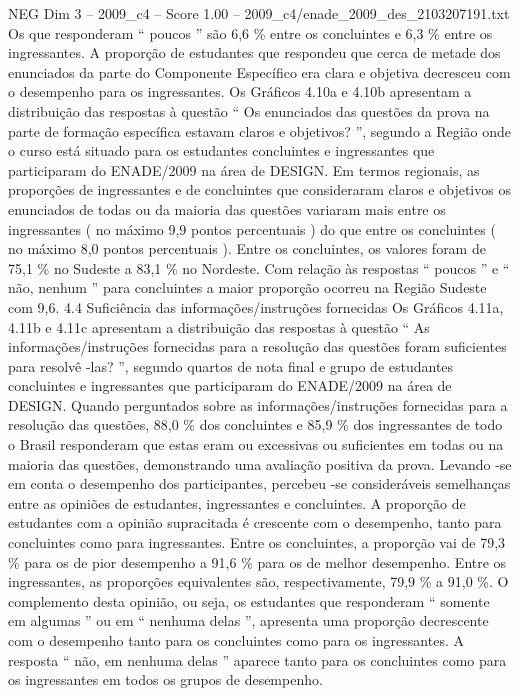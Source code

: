 \begin{textsample}{NEG Dim 3 – 2009\_c4 – Score 1.00 – 2009\_c4/enade\_2009\_des\_2103207191.txt}
Os que responderam “ poucos ” são 6,6 \% entre os concluintes e 6,3 \% entre os ingressantes.
A proporção de estudantes que respondeu que cerca de metade dos enunciados da parte do Componente Específico era clara e objetiva decresceu com o desempenho para os ingressantes.
Os Gráficos 4.10a e 4.10b apresentam a distribuição das respostas à questão “ Os enunciados das questões da prova na parte de formação específica estavam claros e objetivos? ”, segundo a Região onde o curso está situado para os estudantes concluintes e ingressantes que participaram do ENADE/2009 na área de DESIGN.
Em termos regionais, as proporções de ingressantes e de concluintes que consideraram claros e objetivos os enunciados de todas ou da maioria das questões variaram mais entre os ingressantes ( no máximo 9,9 pontos percentuais ) do que entre os concluintes ( no máximo 8,0 pontos percentuais ).
Entre os concluintes, os valores foram de 75,1 \% no Sudeste a 83,1 \% no Nordeste.
Com relação às respostas “ poucos ” e “ não, nenhum ” para concluintes a maior proporção ocorreu na Região Sudeste com 9,6. 4.4 Suficiência das informações/instruções fornecidas Os Gráficos 4.11a, 4.11b e 4.11c apresentam a distribuição das respostas à questão “ As informações/instruções fornecidas para a resolução das questões foram suficientes para resolvê -las? ”, segundo quartos de nota final e grupo de estudantes concluintes e ingressantes que participaram do ENADE/2009 na área de DESIGN.
Quando perguntados sobre as informações/instruções fornecidas para a resolução das questões, 88,0 \% dos concluintes e 85,9 \% dos ingressantes de todo o Brasil responderam que estas eram ou excessivas ou suficientes em todas ou na maioria das questões, demonstrando uma avaliação positiva da prova.
Levando -se em conta o desempenho dos participantes, percebeu -se consideráveis semelhanças entre as opiniões de estudantes, ingressantes e concluintes.
A proporção de estudantes com a opinião supracitada é crescente com o desempenho, tanto para concluintes como para ingressantes.
Entre os concluintes, a proporção vai de 79,3 \% para os de pior desempenho a 91,6 \% para os de melhor desempenho.
Entre os ingressantes, as proporções equivalentes são, respectivamente, 79,9 \% a 91,0 \%.
O complemento desta opinião, ou seja, os estudantes que responderam “ somente em algumas ” ou em “ nenhuma delas ”, apresenta uma proporção decrescente com o desempenho tanto para os concluintes como para os ingressantes.
A resposta “ não, em nenhuma delas ” aparece tanto para os concluintes como para os ingressantes em todos os grupos de desempenho.

\end{textsample}
